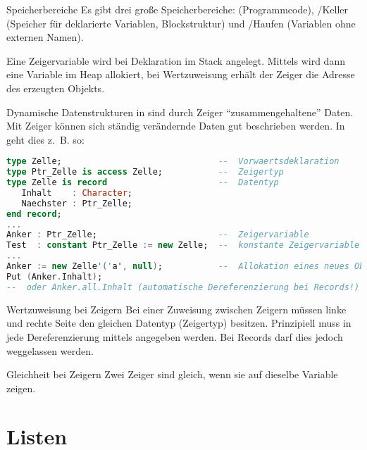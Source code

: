 \begin{Def}{Speicherbereiche}
    Es gibt drei große Speicherbereiche: 
    (Programmcode), /Keller (Speicher für deklarierte Variablen,
    Blockstruktur) und /Haufen (Variablen ohne externen Namen).

    Eine Zeigervariable wird bei Deklaration im Stack angelegt. Mittels
     wird dann eine Variable im Heap allokiert, bei Wertzuweisung
    erhält der Zeiger die Adresse des erzeugten Objekts.
\end{Def}

\begin{Def}{Dynamische Datenstrukturen in \Ada{}}
     sind durch Zeiger
    "`zusammengehaltene"' Daten.
    Mit Zeiger können sich ständig verändernde Daten gut beschrieben werden.
    In \Ada{} geht dies z.~B. so:
\begin{lstlisting}[language=ada]
type Zelle;                               --  Vorwaertsdeklaration
type Ptr_Zelle is access Zelle;           --  Zeigertyp
type Zelle is record                      --  Datentyp
   Inhalt    : Character;
   Naechster : Ptr_Zelle;
end record;
...
Anker : Ptr_Zelle;                        --  Zeigervariable
Test  : constant Ptr_Zelle := new Zelle;  --  konstante Zeigervariable
...
Anker := new Zelle'('a', null);           --  Allokation eines neues Objekts, Nullpointer
Put (Anker.Inhalt);
--  oder Anker.all.Inhalt (automatische Dereferenzierung bei Records!)
\end{lstlisting}
\end{Def}

\begin{Def}{Wertzuweisung bei Zeigern}
    Bei einer Zuweisung zwischen Zeigern müssen linke und rechte Seite den
    gleichen Datentyp (Zeigertyp) besitzen.
    Prinzipiell muss in \Ada{} jede Dereferenzierung mittels 
    angegeben werden.
    Bei Records darf dies jedoch weggelassen werden.
\end{Def}

\begin{Def}{Gleichheit bei Zeigern}
    Zwei Zeiger sind gleich, wenn sie auf dieselbe Variable zeigen.
\end{Def}

\pagebreak

\section{%
    Listen%
}

